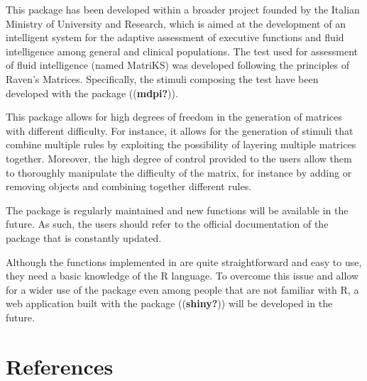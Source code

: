 This package has been developed within a broader project founded by the Italian Ministry of University and Research, which is aimed at the development of an intelligent system for the adaptive assessment of executive functions and fluid intelligence among general and clinical populations. The test used for assessment of fluid intelligence (named MatriKS) was developed following the principles of Raven's Matrices. Specifically, the stimuli composing the test have been developed with the  package ((\textbf{mdpi?})).

This package allows for high degrees of freedom in the generation of matrices with different difficulty. For instance, it allows for the generation of stimuli that combine multiple rules by exploiting the possibility of layering multiple matrices together. Moreover, the high degree of control provided to the users allow them to thoroughly manipulate the difficulty of the matrix, for instance by adding or removing objects and combining together different rules.

The package is regularly maintained and new functions will be available in the future. As such, the users should refer to the official documentation of the package that is constantly updated.

Although the functions implemented in  are quite straightforward and easy to use, they need a basic knowledge of the R language. To overcome this issue and allow for a wider use of the package even among people that are not familiar with R, a web application built with the  package ((\textbf{shiny?})) will be developed in the future.

\section*{References}\label{references}

